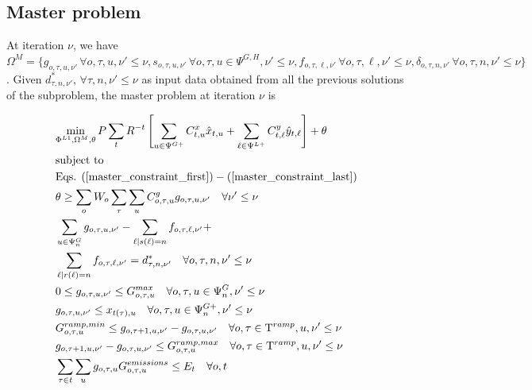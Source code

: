\documentclass[final]{IEEEtran}
\newcommand{\Tau}{\mathrm{T}}
\begin{document}
\subsection{Master problem}

At iteration $\nu$, we have $\Omega^{M} = \{ g_{o, \tau, u, \nu'} \, \forall o, \tau, u, \nu' \leq \nu, s_{o, \tau, u, \nu'} \, \forall o, \tau, u \in \Psi^{G, H}, \nu' \leq \nu, f_{o, \tau, \ell, \nu'} \, \forall o, \tau, \ell, \nu' \leq \nu, \delta_{o, \tau, n, \nu'} \, \forall o, \tau, n, \nu' \leq \nu \}$. Given $d_{\tau, n, \nu'}^*, \, \forall \tau, n, \nu' \leq \nu$ as input data obtained from all the previous solutions of the subproblem, the master problem at iteration $\nu$ is

\begin{align}
&\label{master_obj} \underset{\Phi^{L1}, \Omega^{M}, \theta}{\text{min}} \, P \sum\limits_{t} R^{-t} \left[ \sum\limits_{u \in \Psi^{G+}} C^x_{t, u} \hat{x}_{t, u} + \sum\limits_{\ell \in \Psi^{L+}} C^y_{t, \ell} \hat{y}_{t, \ell} \right] + \theta \\
&\text{subject to} \nonumber \\
&\text{Eqs. } (\ref{master_constraint_first}) - (\ref{master_constraint_last}) \\
&\theta \geq \sum\limits_o W_o \sum\limits_{\tau} \sum\limits_{u} C_{o, \tau, u}^g g_{o, \tau, u, \nu'} \quad \forall \nu' \leq \nu \\
&\sum\limits_{u \in \Psi^G_{n}} g_{o, \tau, u, \nu'} - \sum\limits_{\ell | s(\ell) = n} f_{o, \tau, \ell, \nu'} + \nonumber \\
&\sum\limits_{\ell | r(\ell) = n} f_{o, \tau, \ell, \nu'} = d_{\tau, n, \nu'}^* \quad \forall o, \tau, n, \nu' \leq \nu \\
&0 \leq g_{o, \tau, u, \nu'} \leq G_{o, \tau, u}^{max} \quad \forall o, \tau, u \in \Psi_n^G, \nu' \leq \nu \\
&g_{o, \tau, u, \nu'} \leq x_{t(\tau), u} \quad \forall o, \tau, u \in \Psi_n^{G+}, \nu' \leq \nu \\
&G^{ramp,min}_{o, \tau, u} \leq g_{o, \tau + 1, u, \nu'} - g_{o, \tau, u, \nu'} \quad \forall o, \tau \in \Tau^{ramp}, u, \nu' \leq \nu \\
&g_{o, \tau + 1, u, \nu'} - g_{o, \tau, u, \nu'} \leq G^{ramp,max}_{o, \tau, u} \quad \forall o, \tau \in \Tau^{ramp}, u, \nu' \leq \nu \\
&\sum\limits_{\tau \in t} \sum\limits_{u} g_{o, \tau, u} G^{emissions}_{o, \tau, u} \leq E_{t} \quad \forall o, t \\

\end{align}
\end{document}
